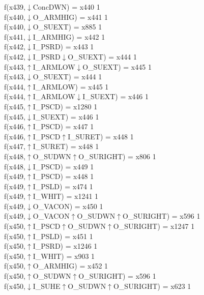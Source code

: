 f(x439,$\downarrow$ConcDWN) = x440 {1} \\
f(x440,$\downarrow$O\_ARMHIG) = x441 {1} \\
f(x440,$\downarrow$O\_SUEXT) = x885 {1} \\
f(x441,$\downarrow$I\_ARMHIG) = x442 {1} \\
f(x442,$\downarrow$I\_PSRD) = x443 {1} \\
f(x442,$\downarrow$I\_PSRD$\downarrow$O\_SUEXT) = x444 {1} \\
f(x443,$\uparrow$I\_ARMLOW$\downarrow$O\_SUEXT) = x445 {1} \\
f(x443,$\downarrow$O\_SUEXT) = x444 {1} \\
f(x444,$\uparrow$I\_ARMLOW) = x445 {1} \\
f(x444,$\uparrow$I\_ARMLOW$\downarrow$I\_SUEXT) = x446 {1} \\
f(x445,$\uparrow$I\_PSCD) = x1280 {1} \\
f(x445,$\downarrow$I\_SUEXT) = x446 {1} \\
f(x446,$\uparrow$I\_PSCD) = x447 {1} \\
f(x446,$\uparrow$I\_PSCD$\uparrow$I\_SURET) = x448 {1} \\
f(x447,$\uparrow$I\_SURET) = x448 {1} \\
f(x448,$\uparrow$O\_SUDWN$\uparrow$O\_SURIGHT) = x806 {1} \\
f(x448,$\downarrow$I\_PSCD) = x449 {1} \\
f(x449,$\uparrow$I\_PSCD) = x448 {1} \\
f(x449,$\uparrow$I\_PSLD) = x474 {1} \\
f(x449,$\uparrow$I\_WHIT) = x1241 {1} \\
f(x449,$\downarrow$O\_VACON) = x450 {1} \\
f(x449,$\downarrow$O\_VACON$\uparrow$O\_SUDWN$\uparrow$O\_SURIGHT) = x596 {1} \\
f(x450,$\uparrow$I\_PSCD$\uparrow$O\_SUDWN$\uparrow$O\_SURIGHT) = x1247 {1} \\
f(x450,$\uparrow$I\_PSLD) = x451 {1} \\
f(x450,$\uparrow$I\_PSRD) = x1246 {1} \\
f(x450,$\uparrow$I\_WHIT) = x903 {1} \\
f(x450,$\uparrow$O\_ARMHIG) = x452 {1} \\
f(x450,$\uparrow$O\_SUDWN$\uparrow$O\_SURIGHT) = x596 {1} \\
f(x450,$\downarrow$I\_SUHE$\uparrow$O\_SUDWN$\uparrow$O\_SURIGHT) = x623 {1} \\
